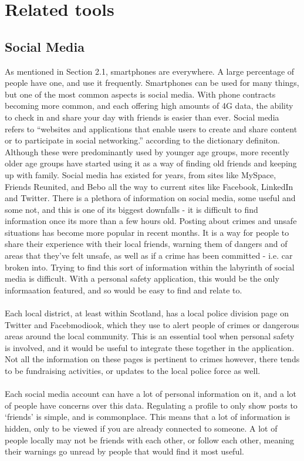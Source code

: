 \documentclass[a4paper]{report}
\begin{document}
 \section{Related tools}
 \label{sec:RelatedTools}
 \subsection{Social Media}
 \label{sec:SocialMedia}
 As mentioned in Section 2.1, smartphones are everywhere. A large percentage of people have one, and use it frequently. Smartphones can be used
 for many things, but one of the most common aspects is social media. With phone contracts becoming more common, and each offering high amounts of 4G data, the ability to check in and share your day with
 friends is easier than ever. Social media refers to ``websites and applications that enable users to create and share content or to participate in social networking.'' according to the dictionary definiton. Although these were predominantly used by younger age groups, more recently older age groups have started using it as a way of finding old friends and keeping
 up with family. Social media has existed for years, from sites like MySpace, Friends Reunited, and Bebo all the way to current sites like Facebook, LinkedIn and Twitter. There is a plethora of information
 on social media, some useful and some not, and this is one of its biggest downfalls - it is difficult to find information once its more than a few hours old. Posting about crimes and unsafe situations has become
 more popular in recent months.  It is a way for people to share their experience with their local friends, warning them of dangers and of areas that they've felt unsafe, as well as if a crime has been committed - i.e. car broken into.
 Trying to find this sort of information within the labyrinth of social media is difficult. With a personal safety application, this would be the only informaation featured, and so would be easy to find and relate to.
 \\ \\Each local district, at least within Scotland, has a local police division page on Twitter and Facebmodiook, which they use to alert people of crimes or dangerous areas around the local community. This is an essential tool
 when personal safety is involved, and it would be useful to integrate these together in the application. Not all the information on these pages is pertinent to crimes however, there tends to be fundraising activities, or
 updates to the local police force as well.
 \\ \\Each social media account can have a lot of personal information on it, and a lot of people have concerns over this data. Regulating a profile to only show posts to `friends' is simple, and is commonplace. This means that
 a lot of information is hidden, only to be viewed if you are already connected to someone. A lot of people locally may not be friends with each other, or follow each other, meaning their warnings go unread by people that would
 find it most useful.
\end{document}

